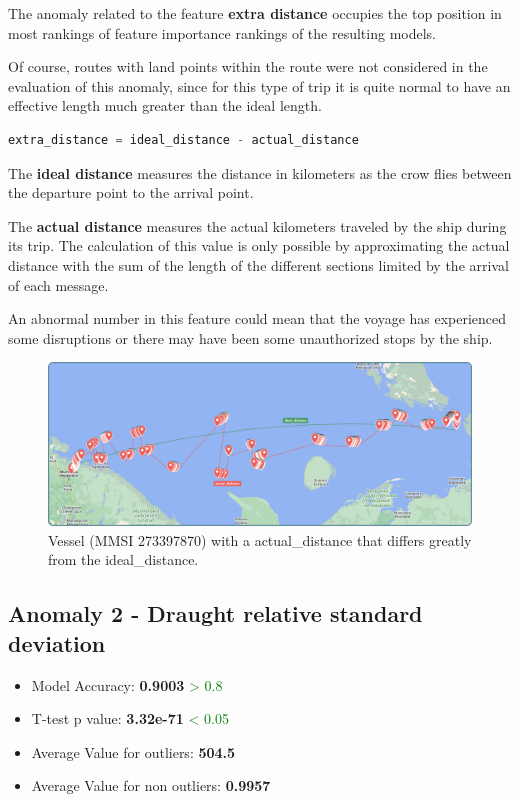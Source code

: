 The anomaly related to the feature \textbf{extra distance} occupies the top position in most rankings of feature importance rankings of the resulting models.

Of course, routes with land points within the route were not considered in the evaluation of this anomaly, since for this type of trip it is quite normal to have an effective length much greater than the ideal length.

\begin{lstlisting}[language=Python]
extra_distance = ideal_distance - actual_distance
\end{lstlisting}

The \textbf{ideal distance} measures the distance in kilometers as the crow flies between the departure point to the arrival point. 
    
The \textbf{actual distance} measures the actual kilometers traveled by the ship during its trip. The calculation of this value is only possible by approximating the actual distance with the sum of the length of the different sections limited by the arrival of each message.

An abnormal number in this feature could mean that the voyage has experienced some disruptions or there may have been some unauthorized stops by the ship.

\begin{figure}[H]
    \centering
    \includegraphics[width=16.5cm]{Images/3/anomaly-1.png}
    \caption{Vessel (MMSI 273397870) with a actual\_distance that differs greatly from the ideal\_distance.}
\end{figure}

\clearpage
\subsection{Anomaly 2 - Draught relative standard deviation}
\label{sec:anomaly-2}

\begin{itemize}
\item Model Accuracy: \textbf{0.9003} \textcolor{green}{> 0.8}
\item T-test p value: \textbf{3.32e-71} \textcolor{green}{< 0.05}
\item Average Value for outliers: \textbf{504.5}
\item Average Value for non outliers: \textbf{0.9957}
\end{itemize}

